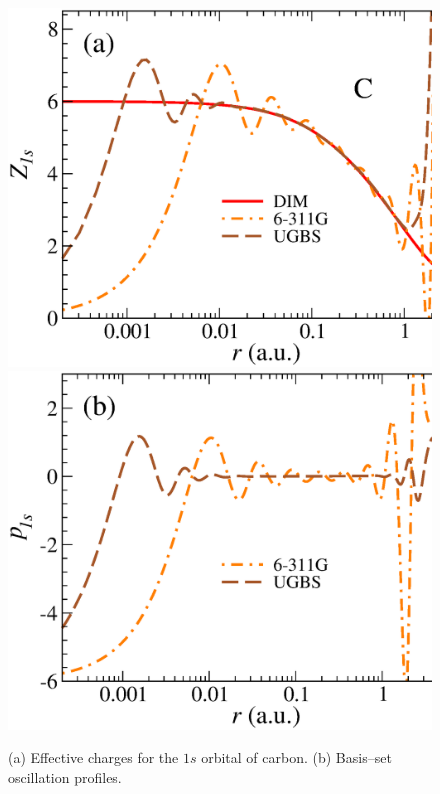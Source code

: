 \documentclass[10pt]{article}
\begin{document}
\begin{figure}[H]
\centering
\includegraphics[height=0.23\textheight]{figures/dimpot/1sCGMSS_BS.eps}
\hspace{0.3cm}
\includegraphics[height=0.23\textheight]{figures/dimpot/1sC_oscprof.eps}
\caption{(a) Effective charges for the $1s$ orbital of carbon. 
(b) Basis--set oscillation profiles.}
\label{fig:1sCarbon}
\end{figure}
\end{document}
